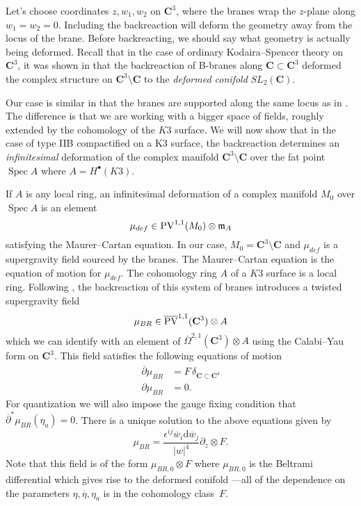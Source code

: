 \documentclass[11pt]{amsart}
\newcommand{\dbar}{\br{\partial}}
\newcommand{\del}{\partial}
\newcommand{\PV}{\op{PV}}
\newcommand{\eps}{\epsilon}
\newcommand{\br}{\overline}
\renewcommand{\d}{\mathrm{d}}
\def\PV{{\rm PV}}
\newcommand{\op}{\operatorname}
\def\eps{{\epsilon}}
\def\bu{{\bullet}}
\newcommand\C{\mathbf{C}}
\DeclareMathOperator{\Spec}{Spec}
\newcommand\beqn{\begin{equation}}
\newcommand\eeqn{\end{equation}}
\theoremstyle{thm}
\numberwithin{equation}{subsection}
\theoremstyle{def}
\theoremstyle{rem}
\begin{document}
Let's choose coordinates $z,w_1,w_2$ on $\C^3$, where the branes wrap the $z$-plane along $w_1=w_2=0$. 
Including the backreaction will deform the geometry away from the locus of the brane. 
Before backreacting, we should say what geometry is actually being deformed. 
Recall that in the case of ordinary Kodaira--Spencer theory on $\C^3$, it was shown in \cite{CGhol} that the backreaction of B-branes along $\C \subset\C^3$ deformed the complex structure on $\C^3 \setminus \C$ to the {\em deformed conifold} $SL_2(\C)$. 

Our case is similar in that the branes are supported along the same locus as in \cite{CGhol}.
The difference is that we are working with a bigger space of fields, roughly extended by the cohomology of the $K3$ surface. 
We will now show that in the case of type IIB compactified on a K3 surface, the backreaction determines an {\em infinitesimal} deformation of the complex manifold $\C^3 \setminus \C$ over the fat point $\Spec A$ where $A = H^\bu(K3)$. 
 
If $A$ is any local ring, an infinitesimal deformation of a complex manifold $M_0$ over $\Spec A$ is an element 
\beqn
\mu_{def} \in \PV^{1,1}(M_0) \otimes \mathfrak{m}_A 
\eeqn
satisfying the Maurer--Cartan equation.
In our case, $M_0 = \C^3 \setminus \C$ and $\mu_{def}$ is a supergravity field sourced by the branes. 
The Maurer--Cartan equation is the equation of motion for $\mu_{def}$. 
The cohomology ring $A$ of a $K3$ surface is a local ring.
Following \cite{CGhol}, the backreaction of this system of branes introduces a twisted supergravity field
\[
\mu_{BR} \in \br\PV^{1,1}(\C^3) \otimes A 
\]
which we can identify with an element of $\br\Omega^{2,1}(\C^3) \otimes A$ using the Calabi--Yau form on $\C^3$. 
This field satisfies the following equations of motion
\beqn
\label{eqn:mcbr}
	\begin{split}
		\dbar \mu_{BR}  & = F \, \delta_{\C \subset \C^3} \\
		\del \mu_{BR} & = 0 .
	\end{split}
\eeqn
For quantization we will also impose the gauge fixing condition that $\dbar^\ast \mu_{BR}(\eta_a) = 0$. 	
There is a unique solution to the above equations given by
\beqn
\mu_{BR} = \frac{\eps^{ij} \br w_i \d \br w_j}{|w|^4} \partial_z \otimes F .
\eeqn
Note that this field is of the form $\mu_{BR,0} \otimes F$ where $\mu_{BR,0}$ is the Beltrami differential which gives rise to the deformed conifold \cite{CGhol}---all of the dependence on the parameters $\eta, \br \eta, \eta_a$ is in the cohomology class~$F$.
\end{document}
